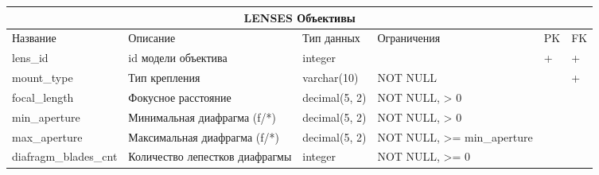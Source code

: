 \documentclass{article}
\begin{document}
\begin{tabular}{ |p{4cm}|p{4cm}|p{2.5cm}|p{3.5cm}|p{2cm}|p{1cm}| }
\hline
\multicolumn{6}{|c|}{LENSES Объективы} \\
\hline
Название & Описание & Тип данных & Ограничения & PK & FK\\
\hline
lens\_id                            &   %
id модели объектива                 &   %
integer                             &   %
                                    &   %
 +                                  &   %
 +                                  \\  %
\hline
mount\_type                         &   %
Тип крепления                       &   %
varchar(10)                         &   %
NOT NULL                            &   %
                                    &   %
 +                                  \\  %
\hline
focal\_length                       &   %
Фокусное расстояние                 &   %
decimal(5, 2)                       &   %
NOT NULL, \linebreak
> 0                                 &   %
                                    &   %
                                    \\  %
\hline
min\_aperture                       &   %
Минимальная диафрагма (f/*)         &   %
decimal(5, 2)                       &   %
NOT NULL, \linebreak
> 0                                 &   %
                                    &   %
                                    \\  %
\hline
max\_aperture                       &   %
Максимальная диафрагма (f/*)        &   %
decimal(5, 2)                       &   %
NOT NULL, \linebreak
>= min\_aperture                    &   %
                                    &   %
                                    \\  %
\hline
diafragm\_blades\_cnt               &   %
Количество лепестков диафрагмы      &   %
integer                             &   %
NOT NULL, \linebreak
>= 0                                &   %
                                    &   %
                                    \\  %

\end{tabular}
\end{document}
